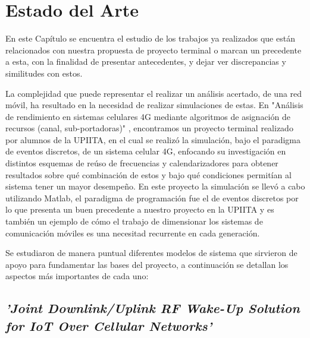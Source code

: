 
\chapter{Estado del Arte} %

\label{Chapter3} %

En este Capítulo se encuentra el estudio de los trabajos ya realizados que están relacionados con nuestra propuesta de proyecto terminal o marcan un precedente a esta, con la finalidad de presentar antecedentes, y dejar ver discrepancias y similitudes con estos.\newline

La complejidad que puede representar el realizar un análisis acertado, de una red móvil, ha resultado en la necesidad de realizar simulaciones de estas. En "Análisis de rendimiento en sistemas celulares 4G mediante algoritmos de asignación de recursos (canal, sub-portadoras)" \parencite{Celis2016}, encontramos un proyecto terminal realizado por alumnos de la UPIITA, en el cual se realizó la simulación, bajo el paradigma de eventos discretos, de un sistema celular 4G, enfocando su investigación en distintos esquemas de reúso de frecuencias y calendarizadores para obtener resultados sobre qué combinación de estos y bajo qué condiciones permitían al sistema tener un mayor desempeño. En este proyecto la simulación se llevó a cabo utilizando Matlab, el paradigma de programación fue el de eventos discretos por lo que presenta un buen precedente a nuestro proyecto en la UPIITA y es también un ejemplo de cómo el trabajo de dimensionar los sistemas de comunicación móviles es una necesitad recurrente en cada generación. \newline

Se estudiaron de manera puntual diferentes modelos de sistema que sirvieron de apoyo para fundamentar las bases del proyecto, a continuación se detallan los aspectos más importantes de cada uno:


\section{\textit{'Joint Downlink/Uplink RF Wake-Up Solution for IoT Over Cellular Networks'}}


